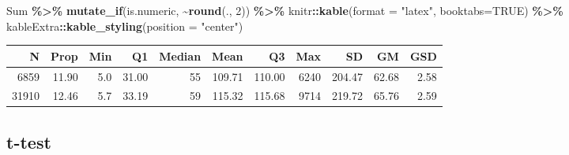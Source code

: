 \documentclass[
  12pt,
]{article}
\newenvironment{Shaded}{\begin{snugshade}}{\end{snugshade}}
\newcommand{\DataTypeTok}[1]{\textcolor[rgb]{0.13,0.29,0.53}{#1}}
\newcommand{\DecValTok}[1]{\textcolor[rgb]{0.00,0.00,0.81}{#1}}
\newcommand{\KeywordTok}[1]{\textcolor[rgb]{0.13,0.29,0.53}{\textbf{#1}}}
\newcommand{\NormalTok}[1]{#1}
\newcommand{\OperatorTok}[1]{\textcolor[rgb]{0.81,0.36,0.00}{\textbf{#1}}}
\newcommand{\OtherTok}[1]{\textcolor[rgb]{0.56,0.35,0.01}{#1}}
\newcommand{\StringTok}[1]{\textcolor[rgb]{0.31,0.60,0.02}{#1}}
\begin{document}
\begin{Shaded}
\begin{Highlighting}[]
\NormalTok{  Sum }\OperatorTok{\%\textgreater{}\%}
\StringTok{    }\KeywordTok{mutate\_if}\NormalTok{(is.numeric, }\OperatorTok{\textasciitilde{}}\KeywordTok{round}\NormalTok{(., }\DecValTok{2}\NormalTok{)) }\OperatorTok{\%\textgreater{}\%}
\StringTok{    }\NormalTok{knitr}\OperatorTok{::}\KeywordTok{kable}\NormalTok{(}\DataTypeTok{format =} \StringTok{"latex"}\NormalTok{, }\DataTypeTok{booktabs=}\OtherTok{TRUE}\NormalTok{) }\OperatorTok{\%\textgreater{}\%}
\StringTok{    }\NormalTok{kableExtra}\OperatorTok{::}\KeywordTok{kable\_styling}\NormalTok{(}\DataTypeTok{position =} \StringTok{"center"}\NormalTok{)}
\end{Highlighting}
\end{Shaded}

\begin{table}[H]
\centering
\begin{tabular}{rrrrrrrrrrr}
\toprule
N & Prop & Min & Q1 & Median & Mean & Q3 & Max & SD & GM & GSD\\
\midrule
6859 & 11.90 & 5.0 & 31.00 & 55 & 109.71 & 110.00 & 6240 & 204.47 & 62.68 & 2.58\\
31910 & 12.46 & 5.7 & 33.19 & 59 & 115.32 & 115.68 & 9714 & 219.72 & 65.76 & 2.59\\
\bottomrule
\end{tabular}
\end{table}

\hypertarget{t-test}{%
\subsection{t-test}\label{t-test}}

\begin{Shaded}
\end{Shaded}
\end{document}

